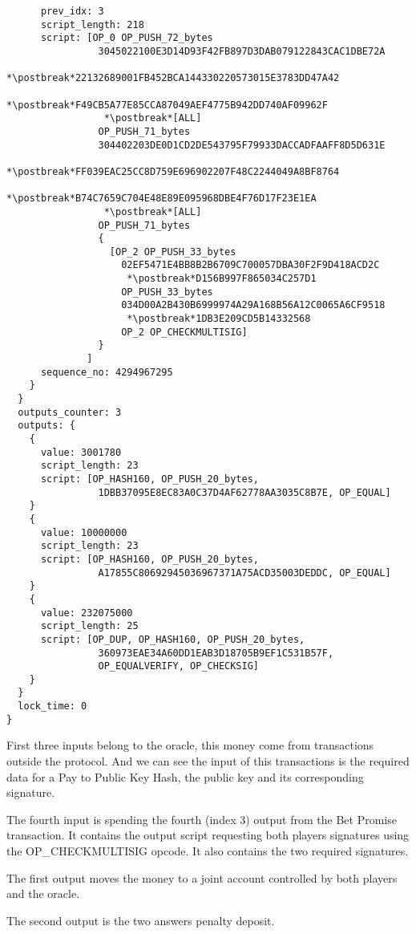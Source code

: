 \begin{lstlisting}
      prev_idx: 3
      script_length: 218
      script: [OP_0 OP_PUSH_72_bytes
                3045022100E3D14D93F42FB897D3DAB079122843CAC1DBE72A
                 *\postbreak*22132689001FB452BCA144330220573015E3783DD47A42
                 *\postbreak*F49CB5A77E85CCA87049AEF4775B942DD740AF09962F
                 *\postbreak*[ALL]
                OP_PUSH_71_bytes
                304402203DE0D1CD2DE543795F79933DACCADFAAFF8D5D631E
                 *\postbreak*FF039EAC25CC8D759E696902207F48C2244049A8BF8764
                 *\postbreak*B74C7659C704E48E89E095968DBE4F76D17F23E1EA
                 *\postbreak*[ALL]
                OP_PUSH_71_bytes
                {
                  [OP_2 OP_PUSH_33_bytes
                    02EF5471E4BB8B2B6709C700057DBA30F2F9D418ACD2C
                     *\postbreak*D156B997F865034C257D1
                    OP_PUSH_33_bytes
                    034D00A2B430B6999974A29A168B56A12C0065A6CF9518
                     *\postbreak*1DB3E209CD5B14332568
                    OP_2 OP_CHECKMULTISIG]
                }
              ]
      sequence_no: 4294967295
    }
  }
  outputs_counter: 3
  outputs: {
    {
      value: 3001780
      script_length: 23
      script: [OP_HASH160, OP_PUSH_20_bytes,
                1DBB37095E8EC83A0C37D4AF62778AA3035C8B7E, OP_EQUAL]
    }
    {
      value: 10000000
      script_length: 23
      script: [OP_HASH160, OP_PUSH_20_bytes,
                A17855C80692945036967371A75ACD35003DEDDC, OP_EQUAL]
    }
    {
      value: 232075000
      script_length: 25
      script: [OP_DUP, OP_HASH160, OP_PUSH_20_bytes,
                360973EAE34A60DD1EAB3D18705B9EF1C531B57F,
                OP_EQUALVERIFY, OP_CHECKSIG]
    }
  }
  lock_time: 0
}
\end{lstlisting}

First three inputs belong to the oracle, this money come from transactions
  outside the protocol.
And we can see the input of this transactions is the required data for a
  Pay to Public Key Hash, the public key and its corresponding signature.

The fourth input is spending the fourth (index 3) output from the Bet Promise
  transaction.
It contains the output script requesting both players signatures using the
  OP\_CHECKMULTISIG opcode.
It also contains the two required signatures.

The first output moves the money to a joint account controlled by both players
  and the oracle.

The second output is the two answers penalty deposit.

